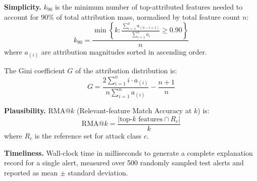 \documentclass[12pt,a4paper]{report}
\begin{document}
\vspace{1em}
\noindent\textbf{Simplicity.} $k_{90}$ is the minimum number of top-attributed features needed to account for 90\% of total attribution mass, normalised by total feature count $n$:
\begin{equation}
k_{90} = \frac{\min \left\{ k : \frac{\sum_{i=1}^{k} a_{(n-i+1)}}{\sum_{i=1}^{n} a_i} \geq 0.90 \right\}}{n}
\end{equation}
where $a_{(i)}$ are attribution magnitudes sorted in ascending order.

The Gini coefficient $G$ of the attribution distribution is:
\begin{equation}
G = \frac{2 \sum_{i=1}^{n} i \cdot a_{(i)}}{n \sum_{i=1}^{n} a_{(i)}} - \frac{n + 1}{n}
\end{equation}

\vspace{1em}
\noindent\textbf{Plausibility.} RMA@$k$ (Relevant-feature Match Accuracy at $k$) is:
\begin{equation}
\text{RMA@}k = \frac{|\text{top-}k \text{ features} \cap R_c|}{k}
\end{equation}
where $R_c$ is the reference set for attack class $c$.

\vspace{1em}
\noindent\textbf{Timeliness.} Wall-clock time in milliseconds to generate a complete explanation record for a single alert, measured over 500 randomly sampled test alerts and reported as mean $\pm$ standard deviation.

\vspace{1em}
\end{document}
